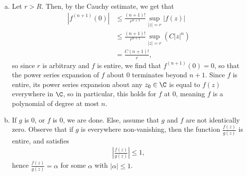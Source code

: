 \documentclass[10pt]{mypackage}
\begin{document}
\begin{solution}\hfill
  \begin{enumerate}[(a)]
    \item Let $r > R$. Then, by the Cauchy estimate, we get that
      \begin{align*}
        \left\vert f^{\left(n+1\right)}(0) \right\vert &\leq \frac{\left( n+1 \right)!}{r^{n+1}}\sup_{|z| = r} \left\vert f(z) \right\vert\\
                                                       &\leq \frac{\left( n+1 \right)!}{r^{n+1}} \sup_{|z| = r} \left( C \left\vert z \right\vert^{n} \right)\\
                                                       &= \frac{C\left( n+1 \right)!}{r},
      \end{align*}
      so since $r$ is arbitrary and $f$ is entire, we find that $ f^{(n+1)}(0) = 0 $, so that the power series expansion of $f$ about $0$ terminates beyond $n + 1$. Since $f$ is entire, its power series expansion about any $z_0\in \C$ is equal to $f(z)$ everywhere in $\C$, so in particular, this holds for $f$ at $0$, meaning $f$ is a polynomial of degree at most $n$.
    \item If $g$ is $0$, or $f$ is $0$, we are done. Else, assume that $g$ and $f$ are not identically zero. Observe that if $g$ is everywhere non-vanishing, then the function $ \frac{f(z)}{g(z)} $ is entire, and satisfies
      \begin{align*}
        \left\vert \frac{f(z)}{g(z)} \right\vert \leq 1,
      \end{align*}
      hence $ \frac{f(z)}{g(z)} = \alpha $ for some $\alpha$ with $\left\vert \alpha \right\vert \leq 1$.\newline


\end{enumerate}
\end{solution}
\end{document}
